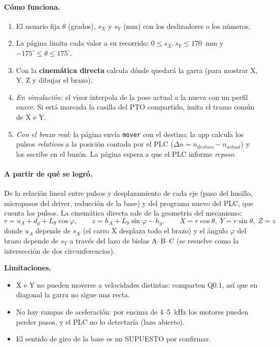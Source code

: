 \documentclass[a4paper,11pt]{article}
\newcommand{\codigo}[1]{\texttt{#1}}
\newcommand{\limite}[1]{\par\smallskip\noindent\colorbox{rojo!8}{\parbox{\dimexpr\linewidth-2\fboxsep}{\textbf{\color{rojo}Limitaciones.} #1}}\par\smallskip}
\begin{document}
\paragraph{Cómo funciona.}
\begin{enumerate}
\item El usuario fija $\theta$ (grados), $s_X$ y $s_Y$ (mm) con los deslizadores o los números.
\item La página limita cada valor a su recorrido: $0 \le s_X, s_Y \le 170$~mm y $-175^\circ \le \theta \le 175^\circ$.
\item Con la \textbf{cinemática directa} calcula dónde quedará la garra (para mostrar X, Y, Z y dibujar el brazo).
\item \emph{En simulación:} el visor interpola de la pose actual a la nueva con un perfil suave. Si está marcada la casilla del PTO compartido, imita el tramo común de X e Y.
\item \emph{Con el brazo real:} la página envía \codigo{mover} con el destino; la app calcula los pulsos \emph{relativos} a la posición contada por el PLC ($\Delta n = n_{destino} - n_{actual}$) y los escribe en el buzón. La página espera a que el PLC informe \emph{reposo}.
\end{enumerate}

\paragraph{A partir de qué se logró.} De la relación lineal entre pulsos y desplazamiento de cada eje (paso del husillo, micropasos del driver, reducción de la base) y del programa nuevo del PLC, que cuenta los pulsos. La cinemática directa sale de la geometría del mecanismo:
\[
r = u_A + d_g + L_9\cos\varphi, \qquad z = h_A + L_9 \sin\varphi - h_g, \qquad X = r\cos\theta,\; Y = r\sin\theta,\; Z = z
\]
donde $u_A$ depende de $s_X$ (el carro X desplaza todo el brazo) y el ángulo $\varphi$ del brazo depende de $s_Y$ a través del lazo de bielas A--B--C (se resuelve como la intersección de dos circunferencias).

\limite{\begin{itemize}[leftmargin=5mm, topsep=0pt]
\item X e Y no pueden moverse a velocidades distintas: comparten Q0.1, así que en diagonal la garra no sigue una recta.
\item No hay rampas de aceleración: por encima de 4--5~kHz los motores pueden perder pasos, y el PLC no lo detectaría (lazo abierto).
\item El sentido de giro de la base es un SUPUESTO por confirmar.
\end{itemize}}
\end{document}
